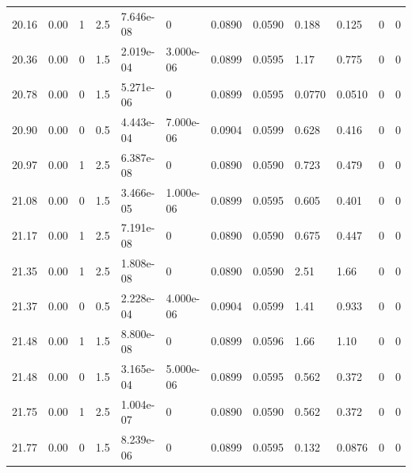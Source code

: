 \documentclass[preview]{standalone}
\begin{document}
{{{{\begin{tabular}{L{1.2cm}C{1.2cm} C{0.3cm}C{0.5cm} C{1.4cm}C{1.4cm} C{1.4cm}C{1.4cm} C{1.6cm}C{1.6cm} C{1.6cm}C{1.6cm}}
  20.16  &  0.00  & 1     & 2.5 &  7.646e-08  & 0  &  0.0890&   0.0590& 0.188 & 0.125   &  0 & 0  \\ 
  20.36  &  0.00  & 0     & 1.5 &  2.019e-04  & 3.000e-06  &  0.0899&   0.0595& 1.17 & 0.775   &  0 & 0  \\ 
  20.78  &  0.00  & 0     & 1.5 &  5.271e-06  & 0  &  0.0899&   0.0595& 0.0770 & 0.0510   &  0 & 0  \\ 
  20.90  &  0.00  & 0     & 0.5 &  4.443e-04  & 7.000e-06  &  0.0904&   0.0599& 0.628 & 0.416   &  0 & 0  \\ 
  20.97  &  0.00  & 1     & 2.5 &  6.387e-08  & 0  &  0.0890&   0.0590& 0.723 & 0.479   &  0 & 0  \\ 
  21.08  &  0.00  & 0     & 1.5 &  3.466e-05  & 1.000e-06  &  0.0899&   0.0595& 0.605 & 0.401   &  0 & 0  \\ 
  21.17  &  0.00  & 1     & 2.5 &  7.191e-08  & 0  &  0.0890&   0.0590& 0.675 & 0.447   &  0 & 0  \\ 
  21.35  &  0.00  & 1     & 2.5 &  1.808e-08  & 0  &  0.0890&   0.0590& 2.51 & 1.66   &  0 & 0  \\ 
  21.37  &  0.00  & 0     & 0.5 &  2.228e-04  & 4.000e-06  &  0.0904&   0.0599& 1.41 & 0.933   &  0 & 0  \\ 
  21.48  &  0.00  & 1     & 1.5 &  8.800e-08  & 0  &  0.0899&   0.0596& 1.66 & 1.10   &  0 & 0  \\ 
  21.48  &  0.00  & 0     & 1.5 &  3.165e-04  & 5.000e-06  &  0.0899&   0.0595& 0.562 & 0.372   &  0 & 0  \\ 
  21.75  &  0.00  & 1     & 2.5 &  1.004e-07  & 0  &  0.0890&   0.0590& 0.562 & 0.372   &  0 & 0  \\ 
  21.77  &  0.00  & 0     & 1.5 &  8.239e-06  & 0  &  0.0899&   0.0595& 0.132 & 0.0876   &  0 & 0  \\ 
\hline 
\end{tabular} 

}}}}
\end{document}

